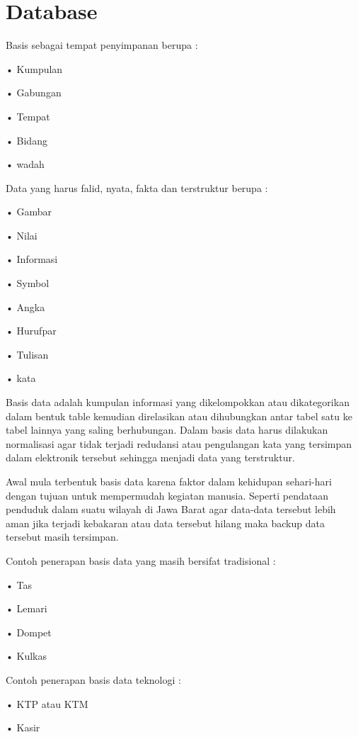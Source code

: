 \documentclass{article}
\begin{document}
\section{Database}
\par Basis sebagai tempat penyimpanan berupa :
\par •	Kumpulan
\par •	Gabungan
\par •	Tempat
\par •	Bidang 
\par •	wadah
\newline
\par Data yang harus falid, nyata, fakta dan terstruktur berupa :
\par •	Gambar
\par •	Nilai
\par •	Informasi
\par •	Symbol
\par •	Angka
\par •	Hurufpar
\par •	Tulisan
\par •	kata
\newline
\par Basis data adalah kumpulan informasi yang dikelompokkan atau dikategorikan dalam bentuk table kemudian direlasikan atau dihubungkan antar tabel satu ke tabel lainnya yang saling berhubungan. Dalam basis data harus dilakukan normalisasi agar tidak terjadi redudansi atau pengulangan kata yang tersimpan dalam elektronik tersebut sehingga menjadi data yang terstruktur.
\newline
\par Awal mula terbentuk basis data karena faktor dalam kehidupan sehari-hari dengan tujuan untuk mempermudah kegiatan manusia. Seperti pendataan penduduk dalam suatu wilayah di Jawa Barat agar data-data tersebut lebih aman jika terjadi	kebakaran atau data tersebut hilang maka backup data tersebut masih tersimpan. 
\newline
\par Contoh penerapan basis data yang masih bersifat tradisional :
\par •	Tas
\par •	Lemari 
\par •	Dompet
\par •	Kulkas
\newline
\par Contoh penerapan basis data teknologi :
\par •	KTP atau KTM
\par •	Kasir
\end{document}
